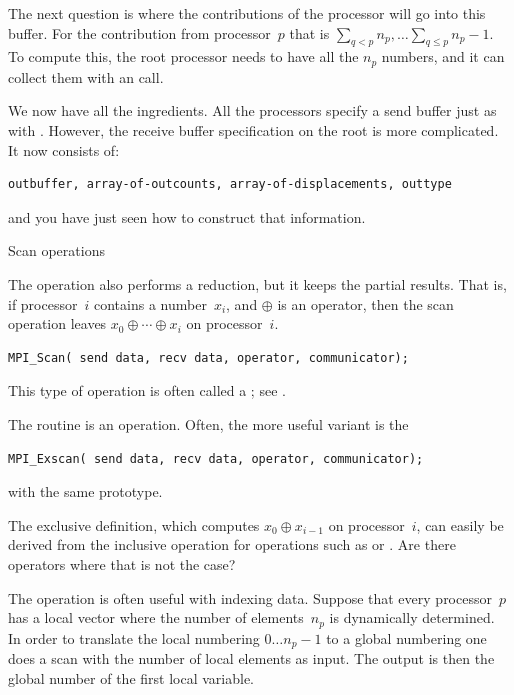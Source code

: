 The next question is where the contributions of the processor will
go into this buffer. For the contribution from processor~$p$
that is $\sum_{q<p}n_p,\ldots\sum_{q\leq p}n_p-1$. To compute this,
the root processor needs to have all the $n_p$ numbers, and it can collect
them with an  call.

We now have all the ingredients.
All the processors specify a send buffer just as with .
However, the receive buffer specification on the root is more complicated. 
It now consists of:
\begin{verbatim}
outbuffer, array-of-outcounts, array-of-displacements, outtype
\end{verbatim}
and you have just seen how to construct that information.

 {Scan operations}

The  operation also performs a reduction, but it keeps 
the partial results. That is, if processor~$i$ contains a number~$x_i$, 
and $\oplus$ is an operator,
then the scan operation leaves $x_0\oplus\cdots\oplus x_i$ on processor~$i$.
\begin{verbatim}
MPI_Scan( send data, recv data, operator, communicator);
\end{verbatim}
This type of operation is often called a ;
see .

The  routine is an  operation.
Often, the more useful variant is the 
\begin{verbatim}
MPI_Exscan( send data, recv data, operator, communicator);
\end{verbatim}
with the same prototype. 

\begin{exercise}
  The exclusive definition, which computes
  $x_0\oplus x_{i-1}$ on processor~$i$, can easily be derived
  from the inclusive operation for operations such as  or .
  Are there operators where that is not the case?
\end{exercise}

The  operation is often useful with indexing data. Suppose that
every processor~$p$ has a local vector where the number of elements~$n_p$ is dynamically 
determined. In order to translate the local numbering $0\ldots n_p-1$ to a global numbering
one does a scan with the number of local elements as input. The output is then the global 
number of the first local variable.

